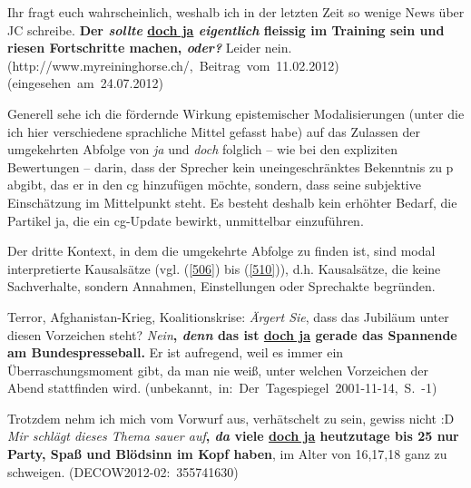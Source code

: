 \begin{exe}
	\ex\label{505} 
	\scriptsize
	Ihr fragt euch wahrscheinlich, weshalb ich in der letzten Zeit so wenige News über JC schreibe. \textbf{Der \textit{sollte} \underline{doch ja} 			\textit{eigentlich} fleissig im Training sein und riesen Fortschritte machen, \textit{\textbf{oder}?}} Leider nein.	
	\hfill\hbox {(http://www.myreininghorse.ch/, Beitrag vom 11.02.2012)}
	\newline
	\hbox{}\hfill\hbox {(eingesehen am 24.07.2012)}
	\newline
	\hbox{}\hfill\hbox {\citet[176]{Mueller2014a}}
\end{exe}        	        
Generell sehe ich die fördernde Wirkung epistemischer Modalisierungen (unter die ich hier verschiedene sprachliche Mittel gefasst habe) auf das Zulassen der umgekehrten Abfolge von \textit{ja} und \textit{doch} folglich – wie bei den expliziten Bewertungen – darin, dass der Sprecher kein uneingeschränktes Bekenntnis zu p abgibt, das er in den cg hinzufügen möchte, sondern, dass seine subjektive Einschätzung  im Mittelpunkt steht. Es besteht deshalb kein erhöhter Bedarf, die Partikel ja, die ein cg-Update bewirkt, unmittelbar einzuführen.		
	
Der dritte Kontext, in dem die umgekehrte Abfolge zu finden ist, sind  modal interpretierte Kausalsätze (vgl. (\ref{506}) bis (\ref{510})), d.h. Kausalsätze, die keine Sachverhalte, sondern Annahmen, Einstellungen oder Sprechakte begründen.

\begin{exe}
	\ex\label{506} 
	\scriptsize
	Terror, Afghanistan-Krieg, Koalitionskrise: \emph{Ärgert Sie}, dass das Jubiläum unter diesen Vorzeichen steht? \emph{Nein}\textbf{, \textit{denn} das ist \underline{doch ja} gerade das Spannende am Bundespresseball.} Er ist aufregend, weil es immer ein Überraschungsmoment gibt, da man nie weiß, unter welchen Vorzeichen der Abend stattfinden wird.	 		 
	\hfill\hbox{(unbekannt, in: Der Tagespiegel 2001-11-14, S. -1)}	
\end{exe}

\begin{exe}
	\ex\label{507} 
	\scriptsize
	Trotzdem nehm ich mich vom Vorwurf aus, verhätschelt zu sein, gewiss nicht :D \emph{Mir schlägt dieses Thema sauer auf}\textbf{, \textit{da} viele \underline{doch ja} heutzutage bis 25 nur Party, Spaß und Blödsinn im Kopf haben}, im Alter von 16,17,18 ganz zu schweigen.  		 
	\hfill\hbox{(DECOW2012-02: 355741630)}	
\end{exe}			 

